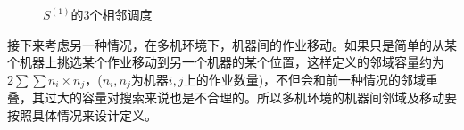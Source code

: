 \begin{figure}[h]
\centering
\vspace{1.5em}
\\
\\
\caption{$S^{(1)}$的$3$个相邻调度\label{fig:3neighbors}}
\end{figure}

接下来考虑另一种情况，在多机环境下，机器间的作业移动。如果只是简单的从某个机器上挑选某个作业移动到另一个机器的某个位置，这样定义的邻域容量约为$2\sum\sum n_i\times n_j$，($n_i,n_j$为机器$i,j$上的作业数量)，不但会和前一种情况的邻域重叠，其过大的容量对搜索来说也是不合理的。所以多机环境的机器间邻域及移动要按照具体情况来设计定义。

